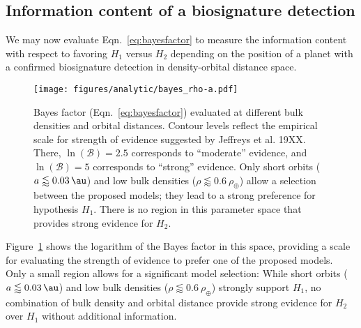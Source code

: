 \subsection{Information content of a biosignature detection}
We may now evaluate Eqn.~\ref{eq:bayesfactor} to measure the information content with respect to favoring $H_1$ versus $H_2$ depending on the position of a planet with a confirmed biosignature detection in density-orbital distance space.
\begin{figure}[ht!]
    \begin{centering}
        \texttt{[image: figures/analytic/bayes\_rho-a.pdf]}
        \caption{
            Bayes factor (Eqn.~\ref{eq:bayesfactor}) evaluated at different bulk densities and orbital distances.
            Contour levels reflect the empirical scale for strength of evidence suggested by Jeffreys et al. 19XX.
            There, $\ln(\mathcal{B}) = 2.5$ corresponds to ``moderate'' evidence, and $\ln(\mathcal{B}) = 5 $ corresponds to ``strong'' evidence.
            Only short orbits ($a \lessapprox \SI{0.03}{\au}$) and low bulk densities ($\rho \lessapprox \SI{0.6}{\rho_\oplus}$) allow a selection between the proposed models; they lead to a strong preference for hypothesis $H_1$.
            There is no region in this parameter space that provides strong evidence for $H_2$.
        }
        \label{fig:bayes_rho-a}
    \end{centering}
\end{figure}
Figure~\ref{fig:bayes_rho-a} shows the logarithm of the Bayes factor in this space, providing a scale for evaluating the strength of evidence to prefer one of the proposed models.
Only a small region allows for a significant model selection: While short orbits ($a \lessapprox \SI{0.03}{\au}$) and low bulk densities ($\rho \lessapprox \SI{0.6}{\rho_\oplus}$) strongly support $H_1$, no combination of bulk density and orbital distance provide strong evidence for $H_2$ over $H_1$ without additional information.





